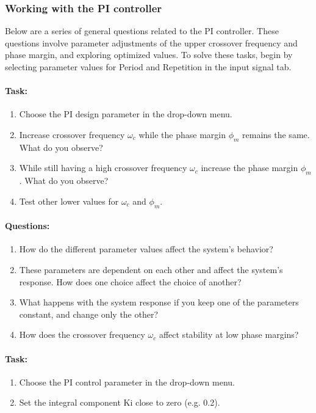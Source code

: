 \newpage
\subsubsection{Working with the PI controller}
Below are a series of general questions related to the PI controller. These questions involve parameter adjustments of the upper crossover frequency and phase margin, and exploring optimized values. To solve these tasks, begin by selecting parameter values for Period and Repetition in the input signal tab.
\paragraph{Task:}
\begin{enumerate}[]
	\item Choose the PI design parameter in the drop-down menu.
	\item Increase crossover frequency $\omega_c$ while the phase margin $\phi_m$ remains the same. What do you observe?
	\item While still having a high crossover frequency $\omega_c$  increase the phase margin $\phi_m$. What do you observe?
	\item Test other lower values for $\omega_c$ and $\phi_m$.
\end{enumerate}
\paragraph{Questions:}
\begin{enumerate}[]
	\item How do the different parameter values affect the system’s behavior?
	\item These parameters are dependent on each other and affect the system's response. How does one choice affect the choice of another?
	\item What happens with the system response if you keep one of the parameters constant, and change only the other?
	\item How does the crossover frequency $\omega_c$ affect stability at low phase margins?
\end{enumerate}
\paragraph{Task:}
\begin{enumerate}[]
	\item Choose the PI control parameter in the drop-down menu.
	\item Set the integral component Ki close to zero (e.g. 0.2).
\end{enumerate}
